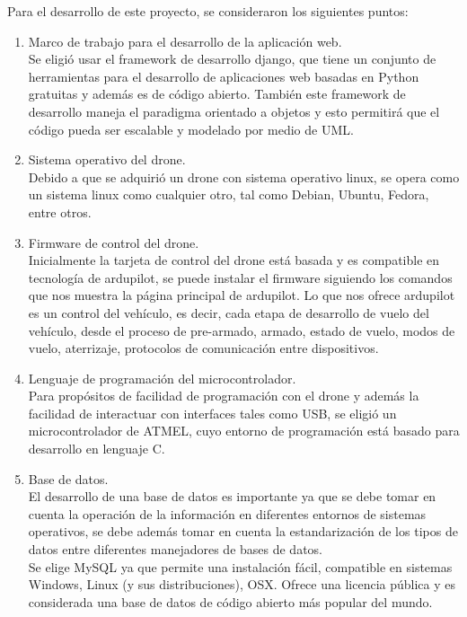 Para el desarrollo de este proyecto, se consideraron los siguientes puntos:

\begin{enumerate}
	\item Marco de trabajo para el desarrollo de la aplicación web. \\
	Se eligió usar el framework de desarrollo django, que tiene un conjunto 
	de herramientas para el desarrollo de aplicaciones web basadas en Python 
	gratuitas y además es de código abierto. También este framework de 
	desarrollo maneja el paradigma orientado a objetos y esto permitirá que 
	el código pueda ser escalable y modelado por medio de UML.

	\item Sistema operativo del drone. \\
	Debido a que se adquirió un drone con sistema operativo linux, se opera 
	como un sistema linux como cualquier otro, tal como Debian, Ubuntu, 
	Fedora, entre otros.

	\item Firmware de control del drone. \\
	Inicialmente la tarjeta de control del drone está basada y es compatible 
	en tecnología de ardupilot, se puede instalar el firmware siguiendo los 
	comandos que nos muestra la página principal de ardupilot. Lo que nos 
	ofrece ardupilot es un control del vehículo, es decir, cada etapa de 
	desarrollo de vuelo del vehículo, desde el proceso de pre-armado, 
	armado, estado de vuelo, modos de vuelo, aterrizaje, protocolos de 
	comunicación entre dispositivos.

	\item Lenguaje de programación del microcontrolador. \\
	Para propósitos de facilidad de programación con el drone y además la 
	facilidad de interactuar con interfaces tales como USB, se eligió un 
	microcontrolador de ATMEL, cuyo entorno de programación está basado para 
	desarrollo en lenguaje C.

	\item Base de datos. \\
	    El desarrollo de una base de datos es importante ya que se debe 
	tomar en cuenta la operación de la información en diferentes entornos de 
	sistemas operativos, se debe además tomar en cuenta la estandarización 
	de los tipos de datos entre diferentes manejadores de bases de datos. \\
	Se elige MySQL ya que permite una instalación fácil, compatible en 
	sistemas Windows, Linux (y sus distribuciones), OSX. Ofrece una licencia 
	pública y es considerada una base de datos de código abierto más popular 
	del mundo.
\end{enumerate}
